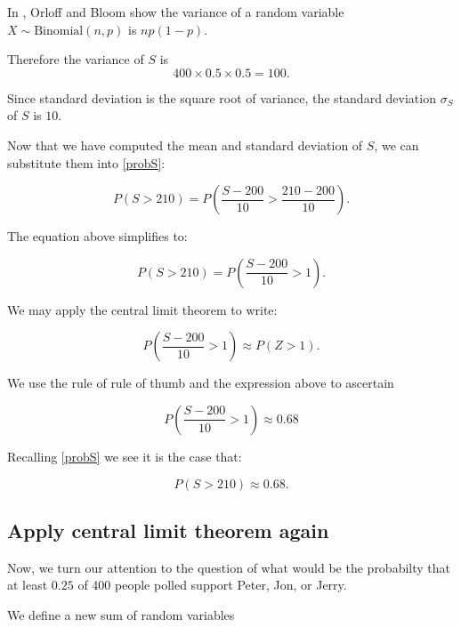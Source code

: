 \documentclass[a5paper,11pt]{article}
\begin{document}
In \cite{reading5a},
Orloff and Bloom show the variance of
a random variable 
$X \sim \text{Binomial}\left(n, p \right)$
is $np\left(1-p\right)$.

Therefore the variance of $S$ is 
\begin{equation}
400\times0.5\times0.5=100.
\end{equation}

Since standard deviation is the square root
of variance, the standard deviation
$\sigma_S$ of $S$ is $10$.

Now that we have computed the mean and
standard deviation of $S$, we can 
substitute them into \ref{probS}: 

\begin{equation} 
P \left(S > 210 \right) = 
P \left( \frac{S - 200}{10} > 
\frac{210- 200}{10}\right).
\end{equation}

The equation above simplifies to:

\begin{equation} 
P \left(S > 210 \right) = 
P \left( \frac{S - 200}{10} > 
1 \right).
\end{equation}

We may apply the central limit theorem 
to write:

\begin{equation} 
P \left( \frac{S - 200}{10} > 1
\right) \approx
P \left(Z > 1 \right).
\end{equation}

We use the rule of rule of thumb 
\cite{reading6b}and the expression
above to ascertain

\begin{equation} 
P \left( \frac{S - 200}{10} > 1
\right) \approx
0.68
\end{equation}

Recalling \ref{probS} we see it is the case
that:

\begin{equation} \label{probS}
P \left(S > 210 \right) \approx 
0.68.
\end{equation}

\subsection{Apply central limit theorem again}
Now, we turn our attention to the question
of what would be the probabilty that at
least $0.25$ of 400 people polled support
Peter, Jon, or Jerry.

We define a new sum of random variables
\end{document}
